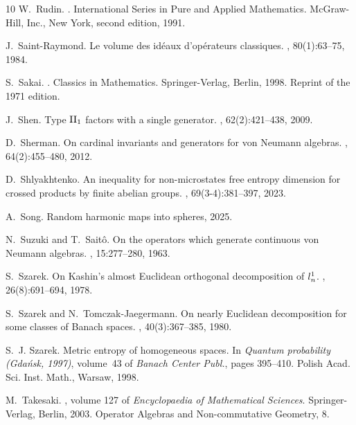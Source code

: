 \documentclass[10pt]{amsart}
\theoremstyle{definition}
\numberwithin{equation}{section}
\begin{document}
\begin{thebibliography}{10}
W.~Rudin.
.
\newblock International Series in Pure and Applied Mathematics. McGraw-Hill, Inc., New York, second edition, 1991.

J.~Saint-Raymond.
\newblock Le volume des id\'{e}aux d'op\'{e}rateurs classiques.
, 80(1):63--75, 1984.

S.~Sakai.
.
\newblock Classics in Mathematics. Springer-Verlag, Berlin, 1998.
\newblock Reprint of the 1971 edition.

J.~Shen.
\newblock Type {$\rm II_1$} factors with a single generator.
, 62(2):421--438, 2009.

D.~Sherman.
\newblock On cardinal invariants and generators for von {N}eumann algebras.
, 64(2):455--480, 2012.

D.~Shlyakhtenko.
\newblock An inequality for non-microstates free entropy dimension for crossed products by finite abelian groups.
, 69(3-4):381--397, 2023.

A.~Song.
\newblock Random harmonic maps into spheres, 2025.

N.~Suzuki and T.~Sait\^o.
\newblock On the operators which generate continuous von {N}eumann algebras.
, 15:277--280, 1963.

S.~Szarek.
\newblock On {K}ashin's almost {E}uclidean orthogonal decomposition of {$l\sp{1}\sb{n}$}.
, 26(8):691--694, 1978.

S.~Szarek and N.~Tomczak-Jaegermann.
\newblock On nearly {E}uclidean decomposition for some classes of {B}anach spaces.
, 40(3):367--385, 1980.

S.~J. Szarek.
\newblock Metric entropy of homogeneous spaces.
\newblock In {\em Quantum probability ({G}da\'{n}sk, 1997)}, volume~43 of {\em Banach Center Publ.}, pages 395--410. Polish Acad. Sci. Inst. Math., Warsaw, 1998.

M.~Takesaki.
, volume 127 of {\em Encyclopaedia of Mathematical Sciences}.
\newblock Springer-Verlag, Berlin, 2003.
\newblock Operator Algebras and Non-commutative Geometry, 8.


\end{thebibliography}
\end{document}
